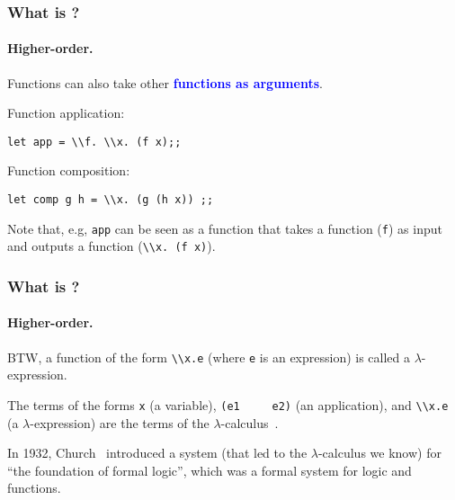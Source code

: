\documentclass[12pt,red]{beamer}
\newcommand{\cemph}[1]{\textcolor{blue}{\textbf{#1}}}
\begin{document}
\begin{frame}
  \frametitle{What is \ML?}

  \framesubtitle{Higher-order.}

  Functions can also take other \cemph{functions as arguments}.

  \vspace{0.2in}

  Function application:
  \vspace*{0.05in}
  \begin{beamerboxesrounded}[shadow=true]{}
    \begin{center}
      \lstinline{let app = \\f. \\x. (f x);;}
    \end{center}
  \end{beamerboxesrounded}

  \vspace{0.1in}

  Function composition:
  \vspace*{0.05in}
  \begin{beamerboxesrounded}[shadow=true]{}
    \begin{center}
      \lstinline{let comp g h = \\x. (g (h x)) ;;}
    \end{center}
  \end{beamerboxesrounded}

  \vspace{0.1in}

  Note that, e.g, \lstinline{app} can be seen as a function that takes
  a function (\lstinline{f}) as input and outputs a function
  (\lstinline{\\x. (f x)}).
\end{frame}


\begin{frame}
  \frametitle{What is \ML?}

  \framesubtitle{Higher-order.}

  BTW, a function of the form \lstinline{\\x.e} (where \lstinline{e}
  is an expression) is called a $\lambda$-expression.

  \vspace{0.2in}

  The terms of the forms \lstinline{x} (a variable), \lstinline{(e1
    e2)} (an application), and \lstinline{\\x.e} (a
  $\lambda$-expression) are the terms of the
  $\lambda$-calculus~\cite{Church:1932,Barendregt:1984}.

  \vspace{0.2in}

  In 1932, Church~\cite{Church:1932} introduced a system (that led to
  the $\lambda$-calculus we know) for ``the foundation of formal
  logic'', which was a formal system for logic and functions.



\end{frame}
\end{document}
